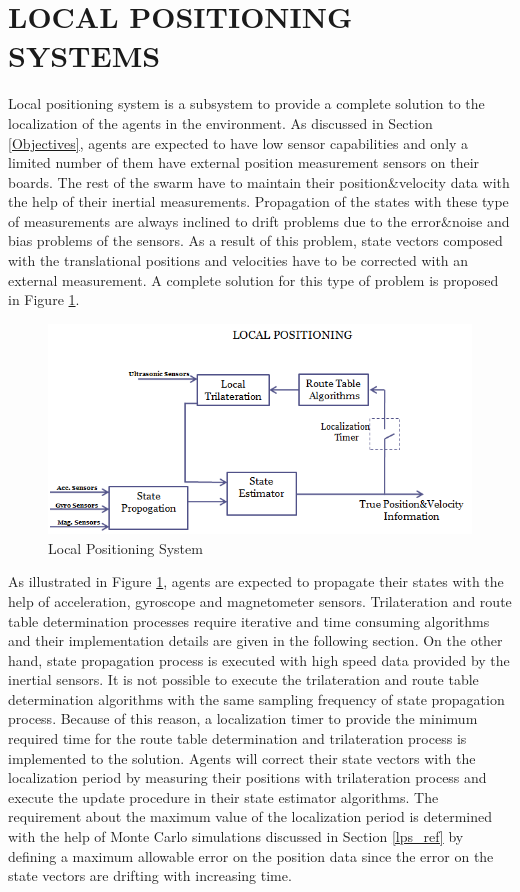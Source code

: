 \section{LOCAL POSITIONING SYSTEMS} \label{LOCAL POSITIONING SYSTEMS_ref}
Local positioning system is a subsystem to provide a complete solution to the localization of the agents in the environment. As discussed in Section \ref{Objectives}, agents are expected to have low sensor capabilities and only a limited number of them have external position measurement sensors on their boards. The rest of the swarm have to maintain their position$\&$velocity data with the help of their inertial measurements. Propagation of the states with these type of measurements are always inclined to drift problems due to the error$\&$noise and bias problems of the sensors. As a result of this problem, state vectors composed with the translational positions and velocities have to be corrected with an external measurement. A complete solution for this type of problem is proposed in Figure \ref{figure_lps}.

\begin{figure}[H]
\caption{Local Positioning System} \label{figure_lps}
\centering
\includegraphics[scale = 0.65]{lps}
\end{figure}

As illustrated in Figure \ref{figure_lps}, agents are expected to propagate their states with the help of acceleration, gyroscope and magnetometer sensors. Trilateration and route table determination processes require iterative and time consuming algorithms and their implementation details are given in the following section. On the other hand, state propagation process is executed with high speed data provided by the inertial sensors. It is not possible to execute the trilateration and route table determination algorithms with the same sampling frequency of state propagation process. Because of this reason, a localization timer to provide the minimum required time for the route table determination and trilateration process is implemented to the solution. Agents will correct their state vectors with the localization period by measuring their positions with trilateration process and execute the update procedure in their state estimator algorithms. The requirement about the maximum value of the localization period is determined with the help of Monte Carlo simulations discussed in Section \ref{lps_ref} by defining a maximum allowable error on the position data since the error on the state vectors are drifting with increasing time.

